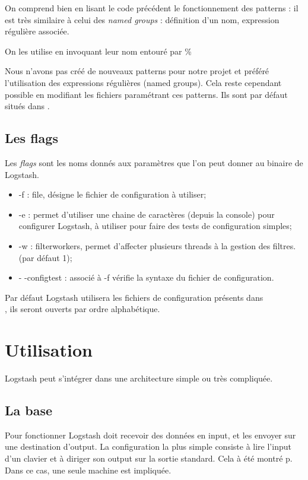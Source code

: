 On comprend bien en lisant le code précédent le fonctionnement des patterns : il est
très similaire à celui des \textit{named groups} : définition d'un nom, expression
régulière associée. 

On les utilise en invoquant leur nom entouré par \%{} 

Nous n'avons pas créé de nouveaux patterns pour notre projet et préféré l'utilisation
des expressions régulières (named groups). Cela reste cependant possible en modifiant les fichiers 
paramétrant ces patterns. Ils sont par défaut situés dans .


\subsection{Les flags}
\label{subsec:logstashflag}
Les \emph{flags} sont les noms donnés aux paramètres que l'on peut donner au binaire
de Logstash.

\begin{itemize}
    \item -f : file, désigne le fichier de configuration à utiliser;
    \item -e : permet d'utiliser une chaine de caractères (depuis la console) pour
    configurer Logstash, à utiliser pour faire des tests de configuration simples;
    \item -w : filterworkers, permet d'affecter plusieurs threads à la gestion des 
    filtres. (par défaut 1);
    \item - -configtest : associé à -f  vérifie la syntaxe 
    du fichier de configuration.
\end{itemize}

Par défaut Logstash utilisera les fichiers de configuration présents dans \\ 
, ils seront ouverts par ordre alphabétique.

\section{Utilisation}
Logstash peut s'intégrer dans une architecture simple ou très compliquée. 


\subsection{La base}
Pour fonctionner Logstash doit recevoir des données en input, et les envoyer sur 
une destination d'output.
La configuration la plus simple consiste à lire l'input d'un clavier et à diriger 
son output sur la sortie standard. Cela à été montré p\pageref{lst:conflogstashminimale}.
Dans ce cas, une seule machine est impliquée. 



